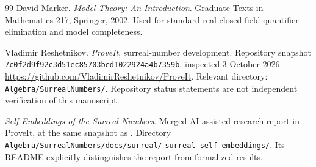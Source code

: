 \documentclass[11pt,a4paper]{article}
\numberwithin{equation}{section}
\theoremstyle{definition}
\theoremstyle{remark}
\begin{document}
\begin{thebibliography}{99}
David Marker.
\emph{Model Theory: An Introduction}.
Graduate Texts in Mathematics 217, Springer, 2002.
Used for standard real-closed-field quantifier elimination and model
completeness.

Vladimir Reshetnikov.
\emph{ProveIt}, surreal-number development.
Repository snapshot
\texttt{7c0f2d9f92c3d51ec85703bed1022924a4b7359b}, inspected
3 October 2026.
\url{https://github.com/VladimirReshetnikov/ProveIt}.
Relevant directory: \texttt{Algebra/SurrealNumbers/}.
Repository status statements are not independent verification of this
manuscript.

\emph{Self-Embeddings of the Surreal Numbers}.
Merged AI-assisted research report in ProveIt, at the same snapshot as
\cite{proveit}. Directory
\texttt{Algebra/SurrealNumbers/docs/surreal/}\allowbreak
\texttt{surreal-self-embeddings/}.
Its README explicitly distinguishes the report from formalized results.

\end{thebibliography}
\end{document}
